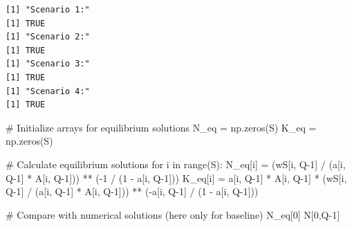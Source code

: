 \documentclass[
  letterpaper,
  DIV=11,
  numbers=noendperiod]{scrreprt}
\newenvironment{Shaded}{\begin{snugshade}}{\end{snugshade}}
\newcommand{\BuiltInTok}[1]{\textcolor[rgb]{0.00,0.23,0.31}{#1}}
\newcommand{\CommentTok}[1]{\textcolor[rgb]{0.37,0.37,0.37}{#1}}
\newcommand{\ControlFlowTok}[1]{\textcolor[rgb]{0.00,0.23,0.31}{#1}}
\newcommand{\DecValTok}[1]{\textcolor[rgb]{0.68,0.00,0.00}{#1}}
\newcommand{\KeywordTok}[1]{\textcolor[rgb]{0.00,0.23,0.31}{#1}}
\newcommand{\NormalTok}[1]{\textcolor[rgb]{0.00,0.23,0.31}{#1}}
\newcommand{\OperatorTok}[1]{\textcolor[rgb]{0.37,0.37,0.37}{#1}}
\begin{document}
\begin{verbatim}
[1] "Scenario 1:"
[1] TRUE
[1] "Scenario 2:"
[1] TRUE
[1] "Scenario 3:"
[1] TRUE
[1] "Scenario 4:"
[1] TRUE
\end{verbatim}

\begin{tcolorbox}[enhanced jigsaw, titlerule=0mm, breakable, bottomrule=.15mm, toprule=.15mm, colbacktitle=quarto-callout-note-color!10!white, rightrule=.15mm, toptitle=1mm, opacityback=0, left=2mm, coltitle=black, title=\textcolor{quarto-callout-note-color}{\faInfo}\hspace{0.5em}{Python code}, colframe=quarto-callout-note-color-frame, opacitybacktitle=0.6, leftrule=.75mm, bottomtitle=1mm, arc=.35mm, colback=white]

\begin{Shaded}
\begin{Highlighting}[]
\CommentTok{\# Initialize arrays for equilibrium solutions}
\NormalTok{N\_eq }\OperatorTok{=}\NormalTok{ np.zeros(S)}
\NormalTok{K\_eq }\OperatorTok{=}\NormalTok{ np.zeros(S)}

\CommentTok{\# Calculate equilibrium solutions}
\ControlFlowTok{for}\NormalTok{ i }\KeywordTok{in} \BuiltInTok{range}\NormalTok{(S):}
\NormalTok{    N\_eq[i] }\OperatorTok{=}\NormalTok{ (wS[i, Q}\OperatorTok{{-}}\DecValTok{1}\NormalTok{] }\OperatorTok{/}\NormalTok{ (a[i, Q}\OperatorTok{{-}}\DecValTok{1}\NormalTok{] }\OperatorTok{*}\NormalTok{ A[i, Q}\OperatorTok{{-}}\DecValTok{1}\NormalTok{])) }\OperatorTok{**}\NormalTok{ (}\OperatorTok{{-}}\DecValTok{1} \OperatorTok{/}\NormalTok{ (}\DecValTok{1} \OperatorTok{{-}}\NormalTok{ a[i, Q}\OperatorTok{{-}}\DecValTok{1}\NormalTok{]))}
\NormalTok{    K\_eq[i] }\OperatorTok{=}\NormalTok{ a[i, Q}\OperatorTok{{-}}\DecValTok{1}\NormalTok{] }\OperatorTok{*}\NormalTok{ A[i, Q}\OperatorTok{{-}}\DecValTok{1}\NormalTok{] }\OperatorTok{*}\NormalTok{ (wS[i, Q}\OperatorTok{{-}}\DecValTok{1}\NormalTok{] }\OperatorTok{/}\NormalTok{ (a[i, Q}\OperatorTok{{-}}\DecValTok{1}\NormalTok{] }\OperatorTok{*}\NormalTok{ A[i, Q}\OperatorTok{{-}}\DecValTok{1}\NormalTok{])) }\OperatorTok{**}\NormalTok{ (}\OperatorTok{{-}}\NormalTok{a[i, Q}\OperatorTok{{-}}\DecValTok{1}\NormalTok{] }\OperatorTok{/}\NormalTok{ (}\DecValTok{1} \OperatorTok{{-}}\NormalTok{ a[i, Q}\OperatorTok{{-}}\DecValTok{1}\NormalTok{]))}

\CommentTok{\# Compare with numerical solutions (here only for baseline)}
\NormalTok{N\_eq[}\DecValTok{0}\NormalTok{]}
\NormalTok{N[}\DecValTok{0}\NormalTok{,Q}\OperatorTok{{-}}\DecValTok{1}\NormalTok{]}


\end{Highlighting}
\end{Shaded}
\end{tcolorbox}
\end{document}
